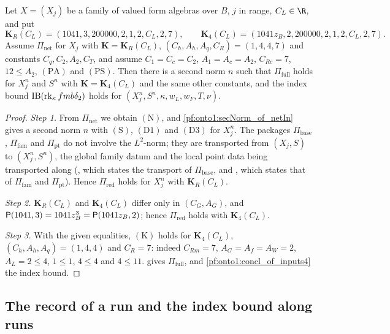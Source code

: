 \begin{proposition}\label{pf:onto1:inputs4_of_net}
Let $X=(X_j)$ be a family of valued form algebras over $B$, $j$ in range, $C_L\in\R$, and put
\[
\mathbf K_R(C_L)=(1041,3,200000,2,1,2,C_L,2,7),\qquad \mathbf K_4(C_L)=(1041z_B,2,200000,2,1,2,C_L,2,7).
\]
Assume $\Pi_{\mathrm{net}}$ for $X_j$ with $\mathbf K=\mathbf K_R(C_L)$, $(C_h,A_h,A_q,C_R)=(1,4,4,7)$ and constants
$C_q,C_2,A_2,C_T$, and assume $C_1=C_c=C_2$, $A_1=A_c=A_2$, $C_{Rc}=7$, $12\le A_2$, $(\mathrm{PA})$ and $(\mathrm{PS})$. Then
there is a second norm $n$ such that $\Pi_{\mathrm{full}}$ holds for $X_j^n$ and $S^n$ with $\mathbf K=\mathbf K_4(C_L)$ and
the same other constants, and the index bound $\mathrm{IB}(\operatorname{rk}_\kappa fmb\delta_2)$ holds for
$(X_j^n,S^n,\kappa,w_L,w_F,T,\nu)$.
\end{proposition}

\begin{proof}
\emph{Step 1.} From $\Pi_{\mathrm{net}}$ we obtain $(\mathrm N)$, and \cref{pf:onto1:secNorm_of_netIn} gives a second norm $n$
with $(\mathrm S)$, $(\mathrm D1)$ and $(\mathrm D3)$ for $X_j^n$. The packages $\Pi_{\mathrm{base}}$, $\Pi_{\mathrm{fam}}$ and
$\Pi_{\mathrm{pt}}$ do not involve the $L^2$-norm; they are transported from $(X_j,S)$ to $(X_j^n,S^n)$, the global family
datum and the local point data being transported along
(, which states the transport of $\Pi_{\mathrm{base}}$, and
, which states that of $\Pi_{\mathrm{fam}}$ and
$\Pi_{\mathrm{pt}}$). Hence $\Pi_{\mathrm{red}}$ holds for $X_j^n$ with $\mathbf K_R(C_L)$.

\emph{Step 2.} $\mathbf K_R(C_L)$ and $\mathbf K_4(C_L)$ differ only in $(C_G,A_G)$, and
$\mathsf{P}(1041,3)=1041z_B^3=\mathsf{P}(1041z_B,2)$; hence $\Pi_{\mathrm{red}}$ holds with $\mathbf K_4(C_L)$.

\emph{Step 3.} With the given equalities, $(\mathrm K)$ holds for $\mathbf K_4(C_L)$, $(C_h,A_h,A_q)=(1,4,4)$ and $C_R=7$:
indeed $C_{Rm}=7$, $A_G=A_f=A_W=2$, $A_L=2\le4$, $1\le1$, $4\le4$ and $4\le11$.  gives
$\Pi_{\mathrm{full}}$, and \cref{pf:onto1:concl_of_inputs4} the index bound.
\end{proof}

\subsection{The record of a run and the index bound along runs}\label{sec:pf:onto1:record}

